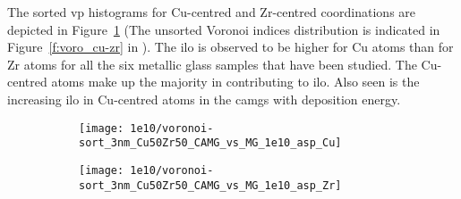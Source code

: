 The sorted \gls{vp} histograms for Cu-centred and Zr-centred coordinations are depicted in Figure~\ref{f:vorosort_cu-zr} (The unsorted Voronoi indices distribution is indicated in Figure~\ref{f:voro_cu-zr} in ). The \gls{ilo} is observed to be higher for Cu atoms than for Zr atoms for all the six metallic glass samples that have been studied. The Cu-centred atoms make up the majority in contributing to \gls{ilo}. Also seen is the increasing \gls{ilo} in Cu-centred atoms in the \gls{camg}s with deposition energy. \par

\begin{figure}[!ht]
	\centering
	\begin{subfigure}{0.5\linewidth} \centering \texttt{[image: 1e10/voronoi-sort\_3nm\_Cu50Zr50\_CAMG\_vs\_MG\_1e10\_asp\_Cu]} 
		\subcaption{} \end{subfigure}%
	\hfill
	\begin{subfigure}{0.5\linewidth} \centering \texttt{[image: 1e10/voronoi-sort\_3nm\_Cu50Zr50\_CAMG\_vs\_MG\_1e10\_asp\_Zr]}
		\subcaption{} \end{subfigure}
	\label{f:vorosort_cu-zr}
\end{figure}


